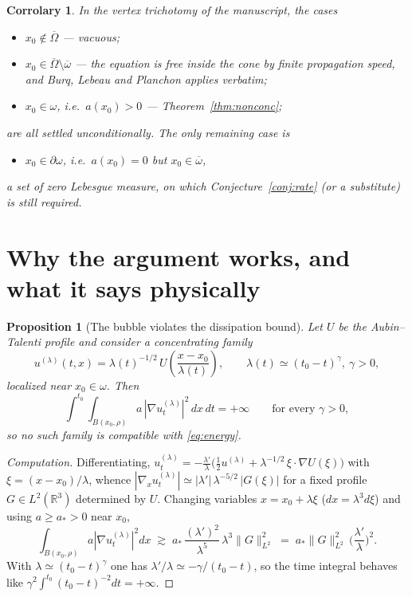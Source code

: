 \documentclass[11pt,letterpaper]{amsart}
\newtheorem{proposition}[theorem]{Proposition}
\newtheorem{corollary}[theorem]{Corrolary}
\newcommand{\Om}{\Omega}
\begin{document}
\begin{corollary}\label{cor:trichotomy}
In the vertex trichotomy of the manuscript, the cases
\begin{itemize}
\item[\rm(E)] $x_0\notin\overline\Om$ --- vacuous;
\item[\rm(A)] $x_0\in\overline\Om\setminus\overline\omega$ --- the equation is free inside the cone
by finite propagation speed, and Burq, Lebeau and Planchon \cite{BurqLebeauPlanchon} applies verbatim;
\item[\rm(B$'$)] $x_0\in\omega$, i.e.\ $a(x_0)>0$ --- Theorem~\ref{thm:nonconc};
\end{itemize}
are all settled unconditionally. The only remaining case is
\begin{itemize}
\item[\rm(C)] $x_0\in\partial\omega$, i.e.\ $a(x_0)=0$ but $x_0\in\overline\omega$,
\end{itemize}
a set of zero Lebesgue measure, on which Conjecture~\ref{conj:rate} (or a substitute) is still required.
\end{corollary}

\section{Why the argument works, and what it says physically}

\begin{proposition}[The bubble violates the dissipation bound]\label{prop:bubble}
Let $U$ be the Aubin--Talenti profile and consider a concentrating family
\[
u^{(\lambda)}(t,x)=\lambda(t)^{-1/2}\,U\!\left(\frac{x-x_0}{\lambda(t)}\right),\qquad
\lambda(t)\simeq (t_0-t)^\gamma,\ \gamma>0,
\]
localized near $x_0\in\omega$. Then
\[
\int^{t_0}\!\!\!\int_{B(x_0,\rho)} a\,|\nabla u^{(\lambda)}_t|^2\,dx\,dt=+\infty
\qquad\text{for every }\gamma>0,
\]
so no such family is compatible with \eqref{eq:energy}.
\end{proposition}

\begin{proof}[Computation]
Differentiating, $u^{(\lambda)}_t=-\tfrac{\lambda'}{\lambda}\big(\tfrac12u^{(\lambda)}
+\lambda^{-1/2}\,\xi\!\cdot\!\nabla U(\xi)\big)$ with $\xi=(x-x_0)/\lambda$, whence
$|\nabla_xu_t^{(\lambda)}|\simeq |\lambda'|\,\lambda^{-5/2}\,|G(\xi)|$ for a fixed profile
$G\in L^2(\mathbb R^3)$ determined by $U$. Changing variables $x=x_0+\lambda\xi$
($dx=\lambda^3d\xi$) and using $a\ge a_*>0$ near $x_0$,
\[
\int_{B(x_0,\rho)}a|\nabla u^{(\lambda)}_t|^2dx \;\gtrsim\; a_*\,\frac{(\lambda')^2}{\lambda^{5}}\,\lambda^{3}\|G\|_{L^2}^2
\;=\;a_*\|G\|_{L^2}^2\,\Big(\frac{\lambda'}{\lambda}\Big)^{2}.
\]
With $\lambda\simeq(t_0-t)^\gamma$ one has $\lambda'/\lambda\simeq -\gamma/(t_0-t)$, so the
time integral behaves like $\gamma^2\!\int^{t_0}(t_0-t)^{-2}dt=+\infty$.
\end{proof}
\end{document}
